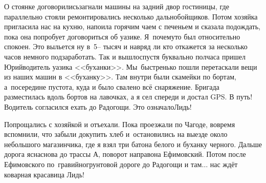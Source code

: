 О стоянке договорились\mdash загнали машины на задний двор гостиницы, где параллельно стояли ремонтировались несколько дальнобойщиков. Потом хозяйка пригласила нас на кухню, напоила горячим чаем с печеньем и сказала подождать, пока она попробует договориться об уазике. Я~почему\sdash то был относительно спокоен. Это выльется ну в~5\thinspace\nobreakdash-- тысяч и навряд ли кто откажется за несколько часов немного подзаработать. Так и вышло\mdash спустя буквально полчаса пришел Юрий\mdash водитель уазика <<буханки>>. Мы~быстренько пошли перетаскали вещи из наших машин в <<буханку>>. Там внутри были скамейки по бортам, а~посередине пустота, куда и было свалено всё снаряжение. Бригада разместилась вдоль бортов на лавочках, а я сел спереди и достал GPS. В путь! Водитель согласился ехать до Радогощи. Это означало\mdash Лидь!

Попрощались с хозяйкой и отъехали. Пока проезжали по Чагоде, вовремя вспомнили, что забыли докупить хлеб и~остановились на выезде около небольшого магазинчика, где я взял три батона белого и буханку черного. Дальше дорога ясна\mdash снова до трассы А, поворот направо\mdash на Ефимовский. Потом после Ефимовского по~гравийно\sdash грунтовой дороге до Радогощи и там$\ldots$ нас ждёт коварная красавица Лидь!

\begin{center}
\end{center}